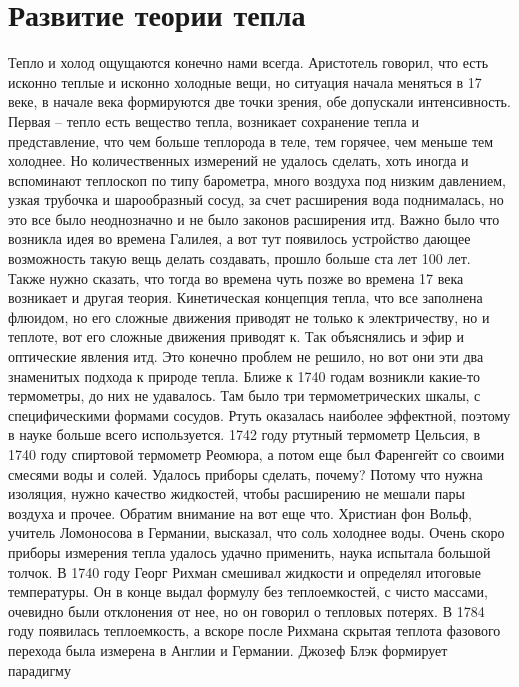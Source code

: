 \documentclass[a4paper, 12pt]{article}
\begin{document}

\section{Развитие теории тепла}

Тепло и холод  ощущаются конечно нами всегда. Аристотель говорил, что 
есть исконно теплые и исконно холодные вещи, но ситуация начала меняться 
в 17 веке, в начале века формируются две точки зрения, обе допускали 
интенсивность. Первая -- тепло есть вещество тепла, возникает сохранение 
тепла и представление, что чем больше теплорода в теле, тем горячее, чем 
меньше тем холоднее. Но количественных измерений не удалось сделать, 
хоть иногда и вспоминают теплоскоп по типу барометра, много воздуха под 
низким давлением, узкая трубочка и шарообразный сосуд, за счет 
расширения вода поднималась, но это все было неоднозначно и не было 
законов расширения итд. Важно было что возникла идея во времена Галилея, 
а вот тут появилось устройство дающее возможность такую вещь делать 
создавать, прошло больше ста лет 100 лет. Также нужно сказать, что тогда 
во времена чуть позже во времена 17 века возникает и другая теория. 
Кинетическая концепция тепла, что все заполнена флюидом, но его сложные 
движения приводят не только к электричеству, но и теплоте, вот его 
сложные движения приводят к. Так объяснялись и эфир и оптические явления 
итд. Это конечно проблем не решило, но вот они эти два знаменитых 
подхода к природе тепла. Ближе к 1740 годам возникли какие-то 
термометры, до них не удавалось. Там было три термометрических шкалы, 
с специфическими формами сосудов. Ртуть оказалась наиболее эффектной, 
поэтому в науке больше всего используется. 1742 году ртутный термометр 
Цельсия, в 1740 году спиртовой термометр Реомюра, а потом еще был 
Фаренгейт со своими смесями воды и солей. Удалось приборы сделать, 
почему? Потому что нужна изоляция, нужно качество жидкостей, чтобы 
расширению не мешали пары воздуха и прочее. Обратим внимание на вот еще 
что. Христиан фон Вольф, учитель Ломоносова в Германии, высказал, что 
соль холоднее воды. Очень скоро приборы измерения тепла удалось удачно 
применить, наука испытала большой толчок. В 1740 году Георг Рихман 
смешивал жидкости и определял итоговые температуры. Он в конце выдал 
формулу без теплоемкостей, с чисто массами, очевидно были отклонения от 
нее, но он говорил о тепловых потерях. В 1784 году появилась 
теплоемкость, а вскоре после Рихмана скрытая теплота фазового перехода 
была измерена в Англии и Германии. Джозеф Блэк формирует парадигму 
\end{document}
